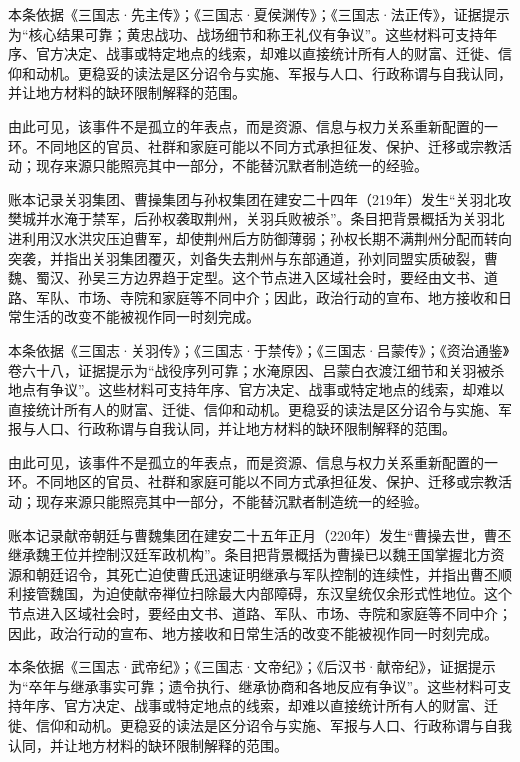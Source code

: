本条依据《三国志·先主传》；《三国志·夏侯渊传》；《三国志·法正传》，证据提示为“核心结果可靠；黄忠战功、战场细节和称王礼仪有争议”。这些材料可支持年序、官方决定、战事或特定地点的线索，却难以直接统计所有人的财富、迁徙、信仰和动机。更稳妥的读法是区分诏令与实施、军报与人口、行政称谓与自我认同，并让地方材料的缺环限制解释的范围。

由此可见，该事件不是孤立的年表点，而是资源、信息与权力关系重新配置的一环。不同地区的官员、社群和家庭可能以不同方式承担征发、保护、迁移或宗教活动；现存来源只能照亮其中一部分，不能替沉默者制造统一的经验。

账本记录关羽集团、曹操集团与孙权集团在建安二十四年（219年）发生“关羽北攻樊城并水淹于禁军，后孙权袭取荆州，关羽兵败被杀”。条目把背景概括为关羽北进利用汉水洪灾压迫曹军，却使荆州后方防御薄弱；孙权长期不满荆州分配而转向突袭，并指出关羽集团覆灭，刘备失去荆州与东部通道，孙刘同盟实质破裂，曹魏、蜀汉、孙吴三方边界趋于定型。这个节点进入区域社会时，要经由文书、道路、军队、市场、寺院和家庭等不同中介；因此，政治行动的宣布、地方接收和日常生活的改变不能被视作同一时刻完成。

本条依据《三国志·关羽传》；《三国志·于禁传》；《三国志·吕蒙传》；《资治通鉴》卷六十八，证据提示为“战役序列可靠；水淹原因、吕蒙白衣渡江细节和关羽被杀地点有争议”。这些材料可支持年序、官方决定、战事或特定地点的线索，却难以直接统计所有人的财富、迁徙、信仰和动机。更稳妥的读法是区分诏令与实施、军报与人口、行政称谓与自我认同，并让地方材料的缺环限制解释的范围。

由此可见，该事件不是孤立的年表点，而是资源、信息与权力关系重新配置的一环。不同地区的官员、社群和家庭可能以不同方式承担征发、保护、迁移或宗教活动；现存来源只能照亮其中一部分，不能替沉默者制造统一的经验。

账本记录献帝朝廷与曹魏集团在建安二十五年正月（220年）发生“曹操去世，曹丕继承魏王位并控制汉廷军政机构”。条目把背景概括为曹操已以魏王国掌握北方资源和朝廷诏令，其死亡迫使曹氏迅速证明继承与军队控制的连续性，并指出曹丕顺利接管魏国，为迫使献帝禅位扫除最大内部障碍，东汉皇统仅余形式性地位。这个节点进入区域社会时，要经由文书、道路、军队、市场、寺院和家庭等不同中介；因此，政治行动的宣布、地方接收和日常生活的改变不能被视作同一时刻完成。

本条依据《三国志·武帝纪》；《三国志·文帝纪》；《后汉书·献帝纪》，证据提示为“卒年与继承事实可靠；遗令执行、继承协商和各地反应有争议”。这些材料可支持年序、官方决定、战事或特定地点的线索，却难以直接统计所有人的财富、迁徙、信仰和动机。更稳妥的读法是区分诏令与实施、军报与人口、行政称谓与自我认同，并让地方材料的缺环限制解释的范围。

